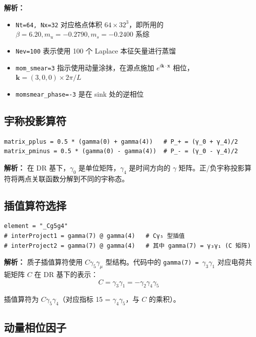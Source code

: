 \documentclass[12pt,a4paper]{ctexart}
\begin{document}
\textbf{解析：}
\begin{itemize}
    \item \texttt{Nt=64, Nx=32} 对应格点体积 $64 \times 32^3$，即所用的 $\beta=6.20, m_u=-0.2790, m_s=-0.2400$ 系综
    \item \texttt{Nev=100} 表示使用 100 个 Laplace 本征矢量进行蒸馏
    \item \texttt{mom\_smear=3} 指示使用动量涂抹，在源点施加 $e^{i\mathbf{k}\cdot\mathbf{x}}$ 相位，$\mathbf{k} = (3,0,0) \times 2\pi/L$
    \item \texttt{momsmear\_phase=-3} 是在 sink 处的逆相位
\end{itemize}

\subsection{宇称投影算符}

\begin{lstlisting}[caption={宇称投影算符构造}]
matrix_pplus = 0.5 * (gamma(0) + gamma(4))   # P_+ = (γ_0 + γ_4)/2
matrix_pminus = 0.5 * (gamma(0) - gamma(4))  # P_- = (γ_0 - γ_4)/2
\end{lstlisting}

\textbf{解析：}
在 DR 基下，$\gamma_0$ 是单位矩阵，$\gamma_4$ 是时间方向的 $\gamma$ 矩阵。正/负宇称投影算符将两点关联函数分解到不同的宇称态。

\subsection{插值算符选择}

\begin{lstlisting}[caption={插值算符构造}]
element = "_Cg5g4"
# interProject1 = gamma(7) @ gamma(4)   # Cγ₅ 型插值
# interProject2 = gamma(7) @ gamma(4)   # 其中 gamma(7) = γ₃γ₁ (C 矩阵)
\end{lstlisting}

\textbf{解析：}
质子插值算符使用 $C\gamma_5\gamma_\mu$ 型结构。代码中的 \texttt{gamma(7) = $\gamma_3\gamma_1$} 对应电荷共轭矩阵 $C$ 在 DR 基下的表示：
\begin{equation}
C = \gamma_3\gamma_1 = -\gamma_2\gamma_4\gamma_5
\end{equation}

插值算符为 $C\gamma_5\gamma_4$（对应指标 15 = $\gamma_4\gamma_5$，与 $C$ 的乘积）。

\subsection{动量相位因子}
\end{document}
